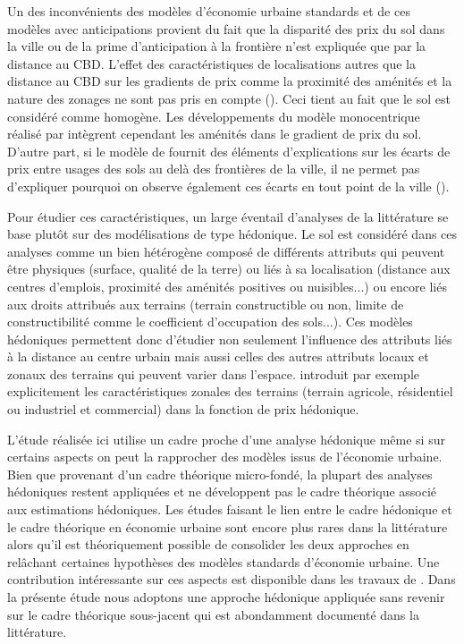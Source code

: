 \documentclass[10.5pt,a4paper]{article}
\begin{document}
{Un des inconvénients des modèles d'économie urbaine standards et de ces modèles avec anticipations provient du fait que la disparité des prix du sol dans la ville ou de la prime d'anticipation à la frontière n'est expliquée que par la distance au CBD. L'effet des caractéristiques de localisations autres que la distance au CBD sur les gradients de prix comme la proximité des aménités et la nature des zonages ne sont pas pris en compte (\cite{Geniaux05}). Ceci tient au fait que le sol est considéré comme homogène. Les développements du modèle monocentrique réalisé par \cite{Fujita89} intègrent cependant les aménités dans le gradient de prix du sol. D'autre part, si le modèle de \cite{Capozza89,Capozza90} fournit des éléments d'explications sur les écarts de prix entre usages des sols au delà des frontières de la ville, il ne permet pas d'expliquer pourquoi on observe également ces écarts en tout point de la ville (\cite{Cava03}). \par

Pour étudier ces caractéristiques, un large éventail d'analyses de la littérature se base plutôt sur des modélisations de type hédonique. Le sol est considéré dans ces analyses comme un bien hétérogène composé de différents attributs qui peuvent être physiques (surface, qualité de la terre) ou liés à sa localisation (distance aux centres d'emplois, proximité des aménités positives ou nuisibles...) ou encore liés aux droits attribués aux terrains (terrain constructible ou non, limite de constructibilité comme le coefficient d'occupation des sols...). Ces modèles hédoniques permettent donc d'étudier non seulement l'influence des attributs liés à la distance au centre urbain mais aussi celles des autres attributs locaux et zonaux des terrains qui peuvent varier dans l'espace. \cite{Chicoine81} introduit par exemple explicitement les caractéristiques zonales des terrains (terrain agricole, résidentiel ou industriel et commercial) dans la fonction de prix hédonique. \par


L'étude réalisée ici utilise un cadre proche d'une analyse hédonique même si sur certains aspects on peut la rapprocher des modèles issus de l'économie urbaine. Bien que provenant d'un cadre théorique micro-fondé, la plupart des analyses hédoniques restent appliquées et ne développent pas le cadre théorique associé aux estimations hédoniques. Les études faisant le lien entre le cadre hédonique et le cadre théorique en économie urbaine sont encore plus rares dans la littérature alors qu'il est théoriquement possible de consolider les deux approches en relâchant certaines hypothèses des modèles standards d'économie urbaine. Une contribution intéressante sur ces aspects est disponible dans les travaux de \cite{Cheshire95,CheshireSheppard02}. Dans la présente étude nous adoptons une approche hédonique appliquée sans revenir sur le cadre théorique sous-jacent qui est abondamment documenté dans la littérature. \par 

}
\end{document}
